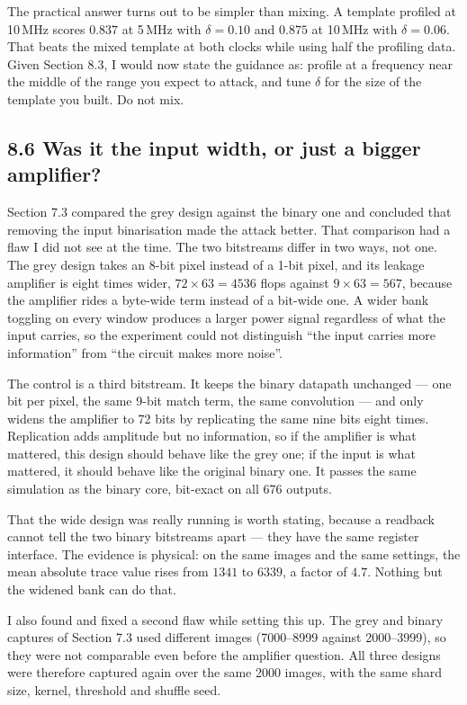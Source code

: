 \documentclass[11pt,a4paper]{article}
\begin{document}
The practical answer turns out to be simpler than mixing. A template profiled at 10\,MHz
scores $0.837$ at 5\,MHz with $\delta = 0.10$ and $0.875$ at 10\,MHz with $\delta = 0.06$. That beats the mixed
template at both clocks while using half the profiling data. Given Section 8.3, I would now
state the guidance as: profile at a frequency near the middle of the range you expect to
attack, and tune $\delta$ for the size of the template you built. Do not mix.


\subsection*{8.6 Was it the input width, or just a bigger amplifier?}

Section 7.3 compared the grey design against the binary one and concluded that removing
the input binarisation made the attack better. That comparison had a flaw I did not see
at the time. The two bitstreams differ in two ways, not one. The grey design takes an
8-bit pixel instead of a 1-bit pixel, and its leakage amplifier is eight times wider,
$72\times63 = 4536$ flops against $9\times63 = 567$, because the amplifier rides a
byte-wide term instead of a bit-wide one. A wider bank toggling on every window produces
a larger power signal regardless of what the input carries, so the experiment could not
distinguish ``the input carries more information'' from ``the circuit makes more noise''.

The control is a third bitstream. It keeps the binary datapath unchanged --- one bit per
pixel, the same 9-bit match term, the same convolution --- and only widens the amplifier
to 72 bits by replicating the same nine bits eight times. Replication adds amplitude but
no information, so if the amplifier is what mattered, this design should behave like the
grey one; if the input is what mattered, it should behave like the original binary one.
It passes the same simulation as the binary core, bit-exact on all 676 outputs.

That the wide design was really running is worth stating, because a readback cannot tell
the two binary bitstreams apart --- they have the same register interface. The evidence is
physical: on the same images and the same settings, the mean absolute trace value rises
from $1341$ to $6339$, a factor of $4.7$. Nothing but the widened bank can do that.

I also found and fixed a second flaw while setting this up. The grey and binary captures
of Section 7.3 used different images (7000--8999 against 2000--3999), so they were not
comparable even before the amplifier question. All three designs were therefore captured
again over the same 2000 images, with the same shard size, kernel, threshold and shuffle
seed.
\end{document}
